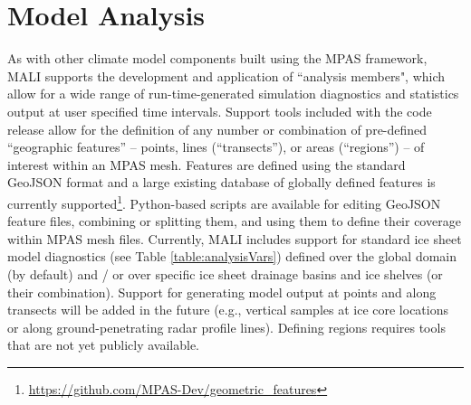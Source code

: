 \chapter{Model Analysis}
\label{chap:landice-analysis}

As with other climate model components built using the MPAS framework, MALI supports the development and application of ``analysis members", which allow for a wide range of run-time-generated simulation diagnostics and statistics output at user specified time intervals. Support tools included with the code release allow for the definition of any number or combination of pre-defined ``geographic features'' -- points, lines (``transects''), or areas (``regions'') -- of interest within an MPAS mesh. Features are defined using the standard GeoJSON format \citep{geojson} and a large existing database of globally defined features is currently supported\footnote{\url{https://github.com/MPAS-Dev/geometric_features}}. Python-based scripts are available for editing GeoJSON feature files, combining or splitting them, and using them to define their coverage within MPAS mesh files. Currently, MALI includes support for standard ice sheet model diagnostics (see Table \ref{table:analysisVars}) defined over the global domain (by default) and / or over specific ice sheet drainage basins and ice shelves (or their combination). Support for generating model output at points and along transects will be  added in the future (e.g., vertical samples at ice core locations or along ground-penetrating radar profile lines). 
Defining regions requires tools that are not yet publicly available.


